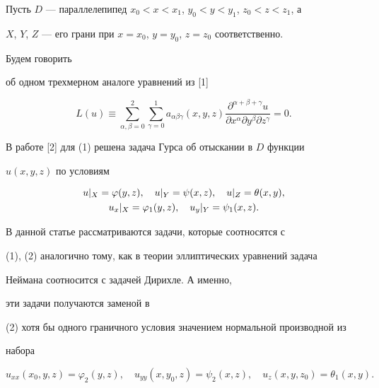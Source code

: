  


 


Пусть $D$ --- параллелепипед $x_0<x<x_1$, $y_0<y<y_1$, $z_0<z<z_1$, а 


$X$, $Y$, $Z$ --- его грани при $x=x_0$, $y=y_0$, $z=z_0$ соответственно. 


Будем говорить 


об одном трехмерном аналоге уравнений из [1] 


\begin{equation} 


L(u)\equiv\sum^2_{\alpha,\beta=0}\sum^1_{\gamma=0} 


a_{\alpha\beta\gamma}(x,y,z) 


\frac{\partial^{\alpha+\beta+\gamma}u} 


{\partial x^\alpha\partial y^\beta\partial z^\gamma}=0. 


\end{equation} 


В работе [2] для (1) решена задача Гурса об отыскании в $D$ функции 


$u(x,y,z)$ по условиям 


\begin{gather} 


u|_X=\varphi(y,z),\quad u|_Y=\psi(x,z),\quad u|_Z=\theta(x,y),\notag\\ 


u_x|_X=\varphi_1(y,z),\quad u_y|_Y=\psi_1(x,z). 


\end{gather} 


 


В данной статье рассматриваются задачи, которые соотносятся с 


(1), (2) аналогично тому, как в теории эллиптических уравнений задача 


Неймана соотносится с задачей Дирихле. А именно, 


эти задачи получаются заменой в 


(2) хотя бы одного граничного условия значением нормальной производной из 


набора 


\begin{equation} 


u_{xx}(x_0,y,z)=\varphi_2(y,z),\quad 


u_{yy}(x,y_0,z)=\psi_2(x,z),\quad 


u_z(x,y,z_0)=\theta_1(x,y). 


\end{equation} 


